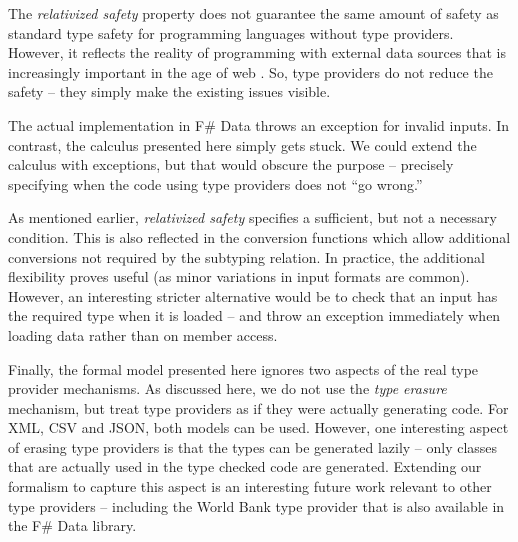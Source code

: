 \documentclass[10pt,preprint,clearpagebib]{sigplanconf}
\begin{document}
The \emph{relativized safety} property does not guarantee the same amount of safety as standard type safety
for programming languages without type providers. However, it reflects the reality of programming with external
data sources that is increasingly important in the age of web \cite{age-of-web}. So, type providers do not
reduce the safety -- they simply make the existing issues visible.

The actual implementation in F\# Data throws an exception for invalid inputs. In contrast, the calculus
presented here simply gets stuck. We could extend the calculus with exceptions, but that would obscure the 
purpose -- precisely specifying when the code using type providers does not ``go wrong.''

As mentioned earlier, \emph{relativized safety} specifies a sufficient, but not a necessary condition.
This is also reflected in the conversion functions which allow additional conversions not required by 
the subtyping relation. In practice, the additional flexibility proves useful (as minor variations in 
input formats are common). However, an interesting stricter alternative would be to check that an input 
has the required type when it is loaded -- and throw an exception immediately when loading data rather than 
on member access.

Finally, the formal model presented here ignores two aspects of the real type provider mechanisms. As discussed
here, we do not use the \emph{type erasure} mechanism, but treat type providers as if they were actually 
generating code. For XML, CSV and JSON, both models can be used. However, one interesting aspect of erasing 
type providers is that the types can be generated lazily -- only classes that are actually used in the type
checked code are generated. Extending our formalism to capture this aspect is an interesting future work
relevant to other type providers -- including the World Bank type provider that is also available
in the F\# Data library.



%
%
\end{document}
